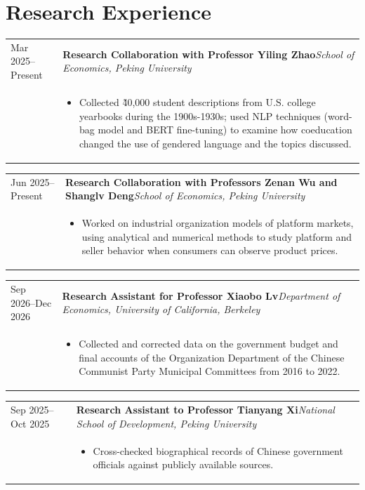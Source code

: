 \documentclass[10pt,a4paper]{article}
\makeatletter
\newcommand{\cvdate}[1]{\small\sffamily\color{muted}#1}
\newcommand{\institution}[1]{\small\itshape\color{muted}#1}
\newcommand{\cventry}[4]{%
  \begin{tabularx}{\textwidth}{@{}>{\raggedleft\arraybackslash}p{0.155\textwidth}@{\hspace{0.85em}}X@{}}
    \cvdate{#1} & \textbf{#2}\hfill\institution{#3}\\[-0.22em]
                 & #4
  \end{tabularx}\par\vspace{0.34em}
}
\makeatother
\begin{document}
\section{Research Experience}
\cventry{Mar 2025--Present}{Research Collaboration with Professor Yiling Zhao}{School of Economics, Peking University}{
  \begin{itemize}
    \item Collected \~40,000 student descriptions from U.S. college yearbooks during the 1900s-1930s; used NLP techniques (word-bag model and BERT fine-tuning) to examine how coeducation changed the use of gendered language and the topics discussed.
  \end{itemize}
}
\cventry{Jun 2025--Present}{Research Collaboration with Professors Zenan Wu and Shanglv Deng}{School of Economics, Peking University}{
  \begin{itemize}
    \item Worked on industrial organization models of platform markets, using analytical and numerical methods to study platform and seller behavior when consumers can observe product prices.
  \end{itemize}
}
\cventry{Sep 2026--Dec 2026}{Research Assistant for Professor Xiaobo Lv}{Department of Economics, University of California, Berkeley}{
  \begin{itemize}
    \item Collected and corrected data on the government budget and final accounts of the Organization Department of the Chinese Communist Party Municipal Committees from 2016 to 2022.
  \end{itemize}
}
\cventry{Sep 2025--Oct 2025}{Research Assistant to Professor Tianyang Xi}{National School of Development, Peking University}{
  \begin{itemize}
    \item Cross-checked biographical records of Chinese government officials against publicly available sources.
  \end{itemize}
}
\end{document}
